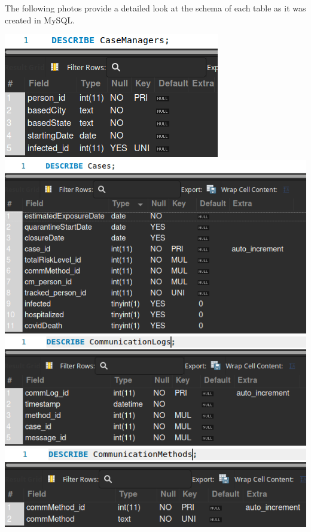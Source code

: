 \documentclass[
]{article}
\begin{document}
The following photos provide a detailed look at the schema of each table
as it was created in MySQL.

\includegraphics{imgs/Describe_CaseManagers.png}\\
\includegraphics{imgs/Describe_Cases.png}\\
\includegraphics{imgs/Describe_CommunicationLogs.png}\\
\includegraphics{imgs/Describe_CommMethods.png}\\
\end{document}

